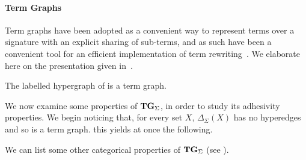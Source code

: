 \documentclass[3p]{elsarticle}
\newcommand{\catname}[1]{\textbf{\textup{#1}}}
\newcommand{\hyp}{\catname{Hyp}}
\newcommand{\tg}[0]{\catname{TG}_{\Sigma}}
\newcommand{\commentato}[1]{ {} }
\theoremstyle{remark}
\theoremstyle{definition}
\begin{document}
\iffalse 
\color{black}
\paragraph{Term Graphs}\label{par:tg}
Term graphs have been adopted as a convenient way to represent terms over a signature with an explicit sharing of sub-terms,
and as such have been a convenient tool for an efficient implementation of term rewriting~\cite{Plu:TGR-ENTCS}.
We elaborate here on the presentation given in~\cite{CastelnovoGM24}.





\begin{exa}
The labelled hypergraph of  is a term graph.
\end{exa}


We now examine some properties of $\tg$, in order to study its adhesivity properties. We begin noticing that, for every set $X$,  $\Delta_\Sigma(X)$ has no hyperedges and so is a term graph. this yields at once the following.

\commentato{
\begin{proof}
	This follows noticing that $\Delta_{\Sigma}(X)$ is a term graph for every object $X$.
\end{proof}}

We can list some other categorical properties of $\tg$ (see \cite[Sec.~5]{CastelnovoGM24}).
\end{document}
